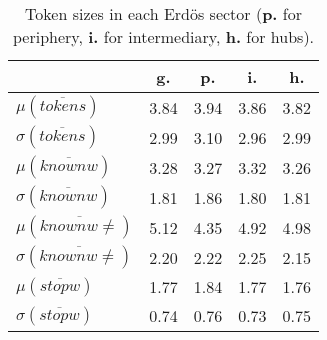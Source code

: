 \begin{table}[h!]
\begin{center}
\begin{tabular}{| l || c | c | c | c |}\hline
 & {\bf g.} & {\bf p.} & {\bf i.} & {\bf h.} \\\hline\hline
$\mu(\overline{tokens})$ & 3.84  & 3.94  & 3.86  & 3.82 \\
$\sigma(\overline{tokens})$ & 2.99  & 3.10  & 2.96  & 2.99 \\\hline
$\mu(\overline{knownw})$ & 3.28  & 3.27  & 3.32  & 3.26 \\
$\sigma(\overline{knownw})$ & 1.81  & 1.86  & 1.80  & 1.81 \\\hline
$\mu(\overline{knownw \neq})$ & 5.12  & 4.35  & 4.92  & 4.98 \\
$\sigma(\overline{knownw \neq})$ & 2.20  & 2.22  & 2.25  & 2.15 \\\hline
$\mu(\overline{stopw})$ & 1.77  & 1.84  & 1.77  & 1.76 \\
$\sigma(\overline{stopw})$ & 0.74  & 0.76  & 0.73  & 0.75 \\\hline
\end{tabular}
\caption{Token sizes in each Erd\"os sector ({{\bf p.}} for periphery, {{\bf i.}} for intermediary, {{\bf h.}} for hubs).}
\end{center}
\end{table}